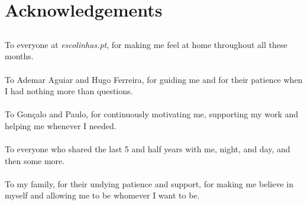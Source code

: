 \chapter*{Acknowledgements}

\section*{}

To everyone at \emph{escolinhas.pt}, for making me feel at home throughout all these months.\\
\ \\
To Ademar Aguiar and Hugo Ferreira, for guiding me and for their patience when I had nothing more than questions.\\
\ \\
To Gonçalo and Paulo, for continuously motivating me, supporting my work and helping me whenever I needed.\\
\ \\
To everyone who shared the last 5 and half years with me, night, and day, and then some more.\\
\ \\
To my family, for their undying patience and support, for making me believe in myself and allowing me to be whomever I want to be.\\

\vspace{10mm}

